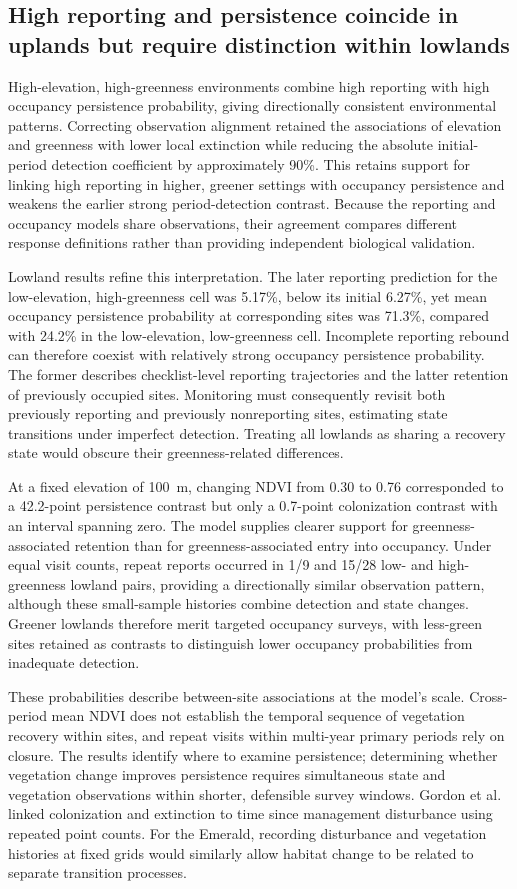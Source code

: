 \subsection{High reporting and persistence coincide in uplands but require distinction within lowlands}
High-elevation, high-greenness environments combine high reporting with high occupancy persistence probability, giving directionally consistent environmental patterns. Correcting observation alignment retained the associations of elevation and greenness with lower local extinction while reducing the absolute initial-period detection coefficient by approximately 90\%. This retains support for linking high reporting in higher, greener settings with occupancy persistence and weakens the earlier strong period-detection contrast. Because the reporting and occupancy models share observations, their agreement compares different response definitions rather than providing independent biological validation.

Lowland results refine this interpretation. The later reporting prediction for the low-elevation, high-greenness cell was 5.17\%, below its initial 6.27\%, yet mean occupancy persistence probability at corresponding sites was 71.3\%, compared with 24.2\% in the low-elevation, low-greenness cell. Incomplete reporting rebound can therefore coexist with relatively strong occupancy persistence probability. The former describes checklist-level reporting trajectories and the latter retention of previously occupied sites. Monitoring must consequently revisit both previously reporting and previously nonreporting sites, estimating state transitions under imperfect detection. Treating all lowlands as sharing a recovery state would obscure their greenness-related differences.

At a fixed elevation of 100~m, changing NDVI from 0.30 to 0.76 corresponded to a 42.2-point persistence contrast but only a 0.7-point colonization contrast with an interval spanning zero. The model supplies clearer support for greenness-associated retention than for greenness-associated entry into occupancy. Under equal visit counts, repeat reports occurred in 1/9 and 15/28 low- and high-greenness lowland pairs, providing a directionally similar observation pattern, although these small-sample histories combine detection and state changes. Greener lowlands therefore merit targeted occupancy surveys, with less-green sites retained as contrasts to distinguish lower occupancy probabilities from inadequate detection.

These probabilities describe between-site associations at the model's scale. Cross-period mean NDVI does not establish the temporal sequence of vegetation recovery within sites, and repeat visits within multi-year primary periods rely on closure. The results identify where to examine persistence; determining whether vegetation change improves persistence requires simultaneous state and vegetation observations within shorter, defensible survey windows. Gordon et al.~\cite{gordon2024} linked colonization and extinction to time since management disturbance using repeated point counts. For the Emerald, recording disturbance and vegetation histories at fixed grids would similarly allow habitat change to be related to separate transition processes.

